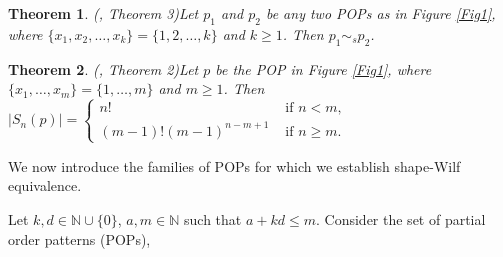\documentclass[12pt, english, a4paper]{article}
\theoremstyle{plain}
\newtheorem{theorem}{Theorem}
\theoremstyle{definition}
\theoremstyle{remark}
\begin{document}
\begin{theorem}{(\cite{burstein-shape-wilf}, Theorem 3)}\label{p1-sim-p2}
Let $p_1$ and $p_2$ be any two POPs as in Figure \ref{Fig1}, where $\{x_1, x_2, \ldots , x_k\} =
\{1, 2, \ldots , k\}$ and $k\geq 1$. Then $p_1 \sim_s p_2$.
\end{theorem}



\begin{theorem}{(\cite{gao-kitaev-length-4-5-pops}, Theorem 2)}\label{claw_size}
    Let $p$ be the POP in Figure \ref{Fig1}, where $\{x_1,\ldots , x_m\}=\{1, \ldots ,m\}$ and $m\geq 1$. Then 
    $|S_n(p)|=\begin{cases}
        n! & \text{ if }n<m,\\
        (m-1)!(m-1)^{n-m+1} &\text{ if }n \geq m.
    \end{cases}$
\end{theorem}

We now introduce the families of POPs for which we establish shape-Wilf equivalence.

Let $k,d \in \mathbb{N}\cup \{0\}$, $a,m\in \mathbb{N}$ such that $a+kd\leq m$. Consider the set of partial order patterns (POPs), 
\end{document}

